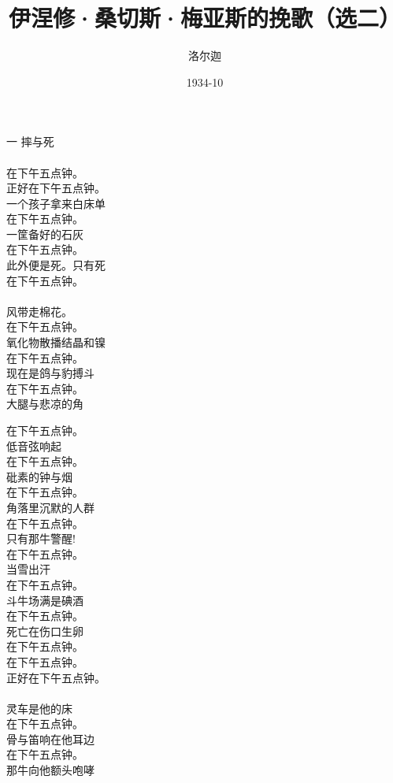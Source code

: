\documentclass{article}
\title{伊涅修·桑切斯·梅亚斯的挽歌（选二）}
\author{洛尔迦}
\date{1934-10}
\begin{document}

\maketitle

\setlength\parindent{0pt}

\begin{center}

\begin{minipage}{0.5\linewidth}

\Large

﻿一 摔与死 \\
 \\
在下午五点钟。 \\
正好在下午五点钟。 \\
一个孩子拿来白床单 \\
在下午五点钟。 \\
一筐备好的石灰 \\
在下午五点钟。 \\
此外便是死。只有死 \\
在下午五点钟。 \\
 \\
风带走棉花。 \\
在下午五点钟。 \\
氧化物散播结晶和镍 \\
在下午五点钟。 \\
现在是鸽与豹搏斗 \\
在下午五点钟。 \\
大腿与悲凉的角 \\

\end{minipage}

\newpage

\begin{minipage}{0.5\linewidth}

\Large

在下午五点钟。 \\
低音弦响起 \\
在下午五点钟。 \\
砒素的钟与烟 \\
在下午五点钟。 \\
角落里沉默的人群 \\
在下午五点钟。 \\
只有那牛警醒! \\
在下午五点钟。 \\
当雪出汗 \\
在下午五点钟。 \\
斗牛场满是碘酒 \\
在下午五点钟。 \\
死亡在伤口生卵 \\
在下午五点钟。 \\
在下午五点钟。 \\
正好在下午五点钟。 \\
 \\
灵车是他的床 \\
在下午五点钟。 \\
骨与笛响在他耳边 \\
在下午五点钟。 \\
那牛向他额头咆哮 \\


\end{minipage}
\end{center}
\end{document}
